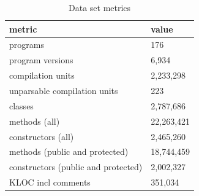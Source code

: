 \begin{table}[]
\centering
\caption{Data set metrics }
\label{tab:data-metrics}
\begin{tabular}{|l|l|} \hline
   metric & value  \\ \hline
   programs & 176  \\
   program versions & 6,934  \\
   compilation units & 2,233,298  \\
   unparsable compilation units & 223  \\
   \hline
   classes & 2,787,686  \\
   methods (all)& 22,263,421  \\
   constructors (all)& 2,465,260  \\
   methods (public and protected) & 18,744,459  \\
   constructors (public and protected) & 2,002,327  \\
   KLOC incl comments& 351,034  \\ \hline
\end{tabular}
\end{table}
